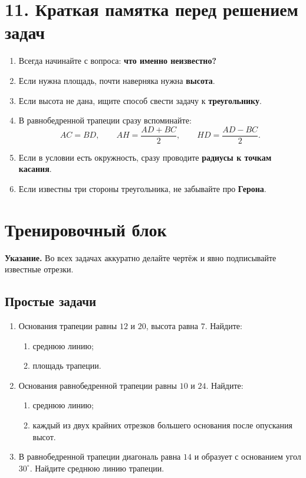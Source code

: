 \documentclass[a4paper,12pt]{article}
\begin{document}
\section*{\textcolor{darkaccent}{11. Краткая памятка перед решением задач}}

\begin{enumerate}
    \item Всегда начинайте с вопроса: \textbf{что именно неизвестно?}
    \item Если нужна площадь, почти наверняка нужна \textbf{высота}.
    \item Если высота не дана, ищите способ свести задачу к \textbf{треугольнику}.
    \item В равнобедренной трапеции сразу вспоминайте:
    \[
    AC=BD,\qquad AH=\frac{AD+BC}{2},\qquad HD=\frac{AD-BC}{2}.
    \]
    \item Если в условии есть окружность, сразу проводите \textbf{радиусы к точкам касания}.
    \item Если известны три стороны треугольника, не забывайте про \textbf{Герона}.
\end{enumerate}

\newpage

\section*{\centering \textcolor{darkaccent}{Тренировочный блок}}

\textbf{Указание.} Во всех задачах аккуратно делайте чертёж и явно подписывайте известные отрезки.

\subsection*{\textcolor{accent}{Простые задачи}}

\begin{enumerate}[label=\textbf{\arabic*.}]
    \item Основания трапеции равны $12$ и $20$, высота равна $7$. Найдите:
    \begin{enumerate}[label=\asbuk*)]
        \item среднюю линию;
        \item площадь трапеции.
    \end{enumerate}

    \item Основания равнобедренной трапеции равны $10$ и $24$. Найдите:
    \begin{enumerate}[label=\asbuk*)]
        \item среднюю линию;
        \item каждый из двух крайних отрезков большего основания после опускания высот.
    \end{enumerate}

    \item В равнобедренной трапеции диагональ равна $14$ и образует с основанием угол $30^\circ$. Найдите среднюю линию трапеции.
\end{enumerate}
\end{document}
